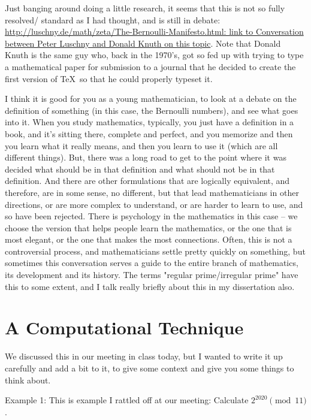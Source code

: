 \documentclass[12pt]{article}
\begin{document}
Just banging around doing a little research, it seems that this is not so fully resolved/ standard as I had thought, and is still in debate: \href{http://luschny.de/math/zeta/The-Bernoulli-Manifesto.html}{http://luschny.de/math/zeta/The-Bernoulli-Manifesto.html: link to Conversation between Peter Luschny and Donald Knuth on this topic}.  Note that Donald Knuth is the same guy who, back in the 1970's, got so fed up with trying to type a mathematical paper for submission to a journal that he decided to create the first version of \TeX\ so that he could properly typeset it.

I think it is good for you as a young mathematician, to look at a debate on the definition of something (in this case, the Bernoulli numbers), and see what goes into it.  When you study mathematics, typically, you just have a definition in a book, and it's sitting there, complete and perfect, and you memorize and then you learn what it really means, and then you learn to use it (which are all different things).  But, there was a long road to get to the point where it was decided what should be in that definition and what should not be in that definition.  And there are other formulations that are logically equivalent, and therefore, are in some sense, no different, but that lead mathematicians in other directions, or are more complex to understand, or are harder to learn to use, and so have been rejected.  There is psychology in the mathematics in this case -- we choose the version that helps people learn the mathematics, or the one that is most elegant, or the one that makes the most connections.  Often, this is not a controversial process, and mathematicians settle pretty quickly on something, but sometimes this conversation serves a guide to the entire branch of mathematics, its development and its history.  The terms "regular prime/irregular prime" have this to some extent, and I talk really briefly about this in my dissertation also.

\section{A Computational Technique}

We discussed this in our meeting in class today, but I wanted to write it up carefully and add a bit to it, to give some context and give you some things to think about.

{\sc Example 1}: This is example I rattled off at our meeting: Calculate $2^{2020} \pmod{11}$.
\end{document}
